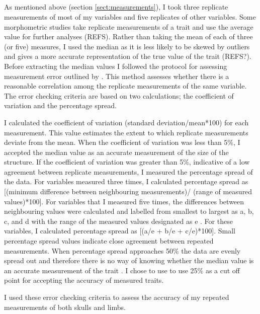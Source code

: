 \subsection{}
	As mentioned above (section \ref{sect:measurements}), I took three replicate measurements of most of my variables and five replicates of other variables. 
	Some morphometric studies take replicate measurements of a trait and use the average value for further analyses (REFS). Rather than taking the mean of each of three (or five) measures, I used the median as it is less likely to be skewed by outliers and gives a more accurate representation of the true value of the trait (REFS?).
	Before extracting the median values I followed the protocol for assessing measurement error outlined by \citep{Cooper2009}. This method assesses whether there is a reasonable correlation among the replicate measurements of the same variable. The error checking criteria are based on two calculations; the coefficient of variation and the percentage spread.
	
	I calculated the coefficient of variation (standard deviation/mean*100) for each measurement. This value estimates the extent to which replicate measurements deviate from the mean. When the coefficient of variation was less than 5\%, I accepted the median value as an accurate measurement of the size of the structure. 
	If the coefficient of variation was greater than 5\%, indicative of a low agreement between replicate measurements, I measured the percentage spread of the data. For variables measured three times, I calculated percentage spread as [(minimum difference between neighbouring measurements)/ (range of measured values)*100].
	For variables that I measured five times, the differences between neighbouring values were calculated and labelled from smallest to largest as a, b, c, and d with the range of the measured values designated as e \citep{Cooper2009}. For these variables, I calculated percentage spread as [(a/e + b/e + c/e)*100]. 
	Small percentage spread values indicate close agreement between repeated measurements. When percentage spread approaches 50\% the data are evenly spread out and therefore there is no way of knowing whether the median value is an accurate measurement of the trait \citep{Cooper2009}. I chose to use to use 25\% as a cut off point for accepting the accuracy of measured traits.

	I used these error checking criteria to assess the accuracy of my repeated measurements of both skulls and limbs. 


